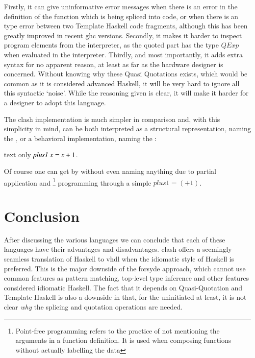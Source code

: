 Firstly, it can give uninformative error messages when there is an error in the definition of the function which is being spliced into code, or when there is an type error between two Template Haskell code fragments, although this has been greatly improved in recent \gls{ghc} versions.
Secondly, it makes it harder to inspect program elements from the interpreter, as the quoted part has the type $Q Exp$ when evaluated in the interpreter. 
Thirdly, and most importantly, it adds extra syntax for no apparent reason, at least as far as the hardware designer is concerned. 
Without knowing why these Quasi Quotations exists, which would be common as it is considered advanced Haskell, it will be very hard to ignore all this syntactic `noise'.
While the reasoning given is clear, it will make it harder for a designer to adopt this language. 

The \gls{clash} implementation is much simpler in comparison and, with this simplicity in mind, can be both interpreted as a structural representation, naming the , or a behavioral implementation, naming the :\\
\begin{changemargin}{1cm}{0cm}
\begin{expansionno}{text only}
\ensuremath{\Varid{plus1}\;\Varid{x}\mathrel{=}\Varid{x}\mathbin{+}\mathrm{1}}.
\end{expansionno}
\end{changemargin}

Of course one can get by without even naming anything due to partial application and \footnote{Point-free programming refers to the practice of not mentioning the arguments in a function definition. It is used when composing functions without actually labelling the data} programming through a simple $plus1 = (+1)$.

\section{Conclusion}
After discussing the various languages we can conclude that each of these languages have their advantages and disadvantages.
\gls{clash} offers a seemingly seamless translation of Haskell to \gls{vhdl} when the idiomatic style of Haskell is preferred.
This is the major downside of the \gls{forsyde} approach, which cannot use common features as pattern matching, top-level type inference and other features considered idiomatic Haskell.
The fact that it depends on Quasi-Quotation and Template Haskell is also a downside in that, for the uninitiated at least, it is not clear \textit{why} the splicing and quotation operations are needed.

